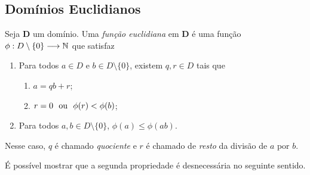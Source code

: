 \subsection{Domínios Euclidianos}

\begin{defi}
	Seja $\bm D$ um domínio. Uma \emph{função euclidiana} em $\bm D$ é uma função $\phi: D \setminus \{0\} \longrightarrow \mathbb{N}$ que satisfaz
	\begin{enumerate}
	\item Para todos $a \in D$ e $b \in D \setminus \{0\}$, existem $q,r \in D$ tais que
		\begin{enumerate}
		\item $a=qb+r$;
		\item $r=0 \text{\ \ ou\ \ } \phi(r)<\phi(b)$;
		\end{enumerate}
	\item Para todos $a,b \in D \setminus \{0\}$, $\phi(a) \leq \phi(ab)$.
	\end{enumerate}
	Nesse caso, $q$ é chamado \emph{quociente} e $r$ é chamado de \emph{resto} da divisão de $a$ por $b$.
\end{defi}

É possível mostrar que a segunda propriedade é desnecessária no seguinte sentido.

